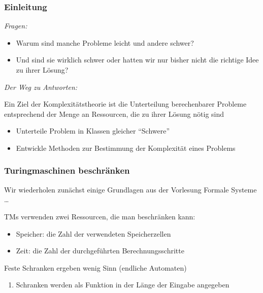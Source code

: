 \documentclass[onlymath]{beamer}
\begin{document}
\begin{frame}\frametitle{Einleitung}

\emph{Fragen:}
\begin{itemize}
\item Warum sind manche Probleme leicht und andere schwer?
\item Und sind sie wirklich schwer oder hatten wir nur bisher nicht die richtige Idee zu ihrer Lösung?
\end{itemize}\bigskip

\emph{Der Weg zu Antworten:}\smallskip

Ein Ziel der \alert{Komplexitätstheorie} ist die Unterteilung berechenbarer Probleme
entsprechend der Menge an Ressourcen, die zu ihrer Lösung nötig sind
\begin{itemize}
\item Unterteile Problem in Klassen gleicher "`Schwere"'
\item Entwickle Methoden zur Bestimmung der Komplexität eines Problems
\end{itemize}

\end{frame}


\begin{frame}\frametitle{Turingmaschinen beschränken}

Wir wiederholen zunächst einige Grundlagen aus der Vorlesung Formale Systeme \ldots
\bigskip

TMs verwenden zwei Ressourcen, die man beschränken kann:
\begin{itemize}
\item \alert{Speicher:} die Zahl der verwendeten Speicherzellen
\item \alert{Zeit:} die Zahl der durchgeführten Berechnungsschritte
\end{itemize}\pause
Feste Schranken ergeben wenig Sinn (endliche Automaten)\\
\begin{enumerate}[$\leadsto$]
\item Schranken werden als Funktion in der Länge der Eingabe angegeben
\end{enumerate}
\bigskip


\end{frame}
\end{document}
